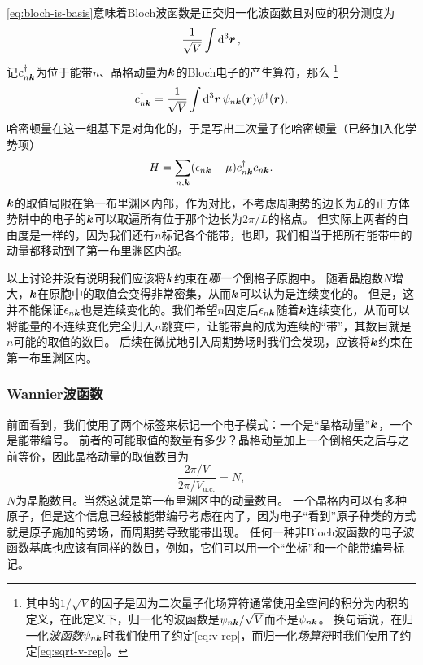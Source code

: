 \eqref{eq:bloch-is-basis}意味着Bloch波函数是正交归一化波函数且对应的积分测度为
\[
    \frac{1}{\sqrt{V}} \int \dd[3]{\vb*{r}},
\]
记${c}_{n\vb*{k}}^\dagger$为位于能带$n$、晶格动量为$\vb*{k}$的Bloch电子的产生算符，那么%
\footnote{其中的$1/\sqrt{V}$的因子是因为二次量子化场算符通常使用全空间的积分为内积的定义，在此定义下，归一化的波函数是$\psi_{n\vb*{k}} / \sqrt{V}$而不是$\psi_{n\vb*{k}}$。
换句话说，在归一化\emph{波函数}$\psi_{n \vb*{k}}$时我们使用了约定\eqref{eq:v-rep}，而归一化\emph{场算符}时我们使用了约定\eqref{eq:sqrt-v-rep}。
}%
\begin{equation}
    {c}_{n \vb*{k}}^\dagger = \frac{1}{\sqrt{V}} \int \dd[3]{\vb*{r}} \psi_{n \vb*{k}}(\vb*{r}) {\psi}^\dagger(\vb*{r}),
\end{equation}
哈密顿量在这一组基下是对角化的，于是写出二次量子化哈密顿量（已经加入化学势项）
\begin{equation}
    {H} = \sum_{n, \vb*{k}} (\epsilon_{n\vb*{k}} - \mu) {c}^\dagger_{n\vb*{k}} {c}_{n\vb*{k}}.
    \label{eq:bloch-band-hamiltonian}
\end{equation}
$\vb*{k}$的取值局限在第一布里渊区内部，作为对比，不考虑周期势的边长为$L$的正方体势阱中的电子的$\vb*{k}$可以取遍所有位于那个边长为$2\pi / L$的格点。
但实际上两者的自由度是一样的，因为我们还有$n$标记各个能带，也即，我们相当于把所有能带中的动量都移动到了第一布里渊区内部。

以上讨论并没有说明我们应该将$\vb*{k}$约束在\emph{哪一个}倒格子原胞中。
随着晶胞数$N$增大，$\vb*{k}$在原胞中的取值会变得非常密集，从而$\vb*{k}$可以认为是连续变化的。
但是，这并不能保证$\epsilon_{n \vb*{k}}$也是连续变化的。我们希望$n$固定后$\epsilon_{n \vb*{k}}$随着$\vb*{k}$连续变化，从而可以将能量的不连续变化完全归入$n$跳变中，让能带真的成为连续的“带”，其数目就是$n$可能的取值的数目。
后续在微扰地引入周期势场时我们会发现，应该将$\vb*{k}$约束在第一布里渊区内。

\subsubsection{Wannier波函数}

前面看到，我们使用了两个标签来标记一个电子模式：一个是“晶格动量”$\vb*{k}$，一个是能带编号。
前者的可能取值的数量有多少？晶格动量加上一个倒格矢之后与之前等价，因此晶格动量的取值数目为
\[
    \frac{2\pi / V}{2\pi / V_\text{u.c.}} = N,
\]
$N$为晶胞数目。当然这就是第一布里渊区中的动量数目。
一个晶格内可以有多种原子，但是这个信息已经被能带编号考虑在内了，因为电子“看到”原子种类的方式就是原子施加的势场，而周期势导致能带出现。
任何一种非Bloch波函数的电子波函数基底也应该有同样的数目，例如，它们可以用一个“坐标”和一个能带编号标记。

